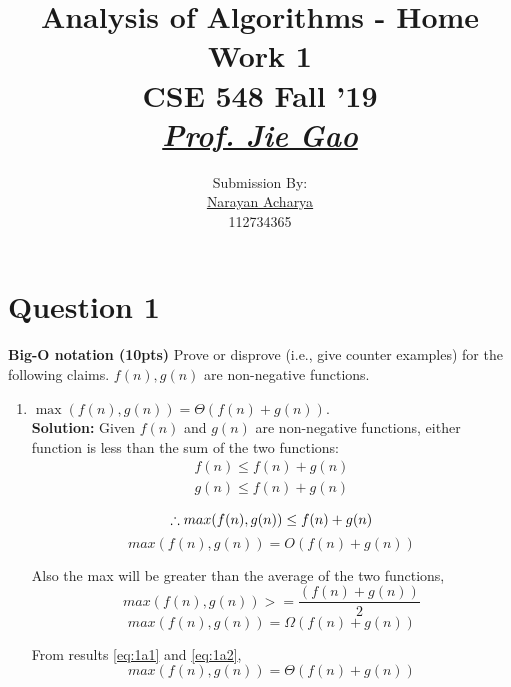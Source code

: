\documentclass[11pt]{article}
\title{
	Analysis of Algorithms - Home Work 1\\[2mm]
	\large CSE 548 Fall '19\\[1mm]
	\href{mailto:jgao@cs.stonybrook.edu}{\textit{Prof. Jie Gao}}
}
\author{
	\small Submission By: \\
	\href{mailto:nacharya@cs.stonybrook.edu}{Narayan Acharya} \\
	\small 112734365
}
\date{\vspace{-5ex}}
\begin{document}
\maketitle
\thispagestyle{fancy} %

\tableofcontents

\clearpage

\section{Question 1}

\textbf{Big-O notation (10pts)} Prove or disprove (i.e., give counter examples) for the following claims. $f(n), g(n)$ are non-negative functions.
    \begin{enumerate}
    \item $\max(f(n), g(n))=\Theta(f(n)+g(n))$. \\
    \textbf{Solution:}
    Given $f(n)$ and $g(n)$ are non-negative functions, either function is less than the sum of the two functions:
    \begin{equation*}
    \begin{split}
	    f(n) \le f(n) + g(n) \\
	    g(n) \le f(n) + g(n) \\
	\end{split}
    \end{equation*}
    \begin{equation*} 
    \therefore max(f(n), g(n)) \le f(n) + g(n) \\
    \end{equation*}
    \begin{equation} \label{eq:1a1}
        \boxed{max(f(n), g(n)) = O(f(n)+g(n))}
    \end{equation}
    
    Also the max will be greater than the average of the two functions,
    \begin{equation*}
		max(f(n), g(n)) >= \frac{(f(n)+g(n))}{2}
    \end{equation*}
    \begin{equation} \label{eq:1a2}
	    \boxed{max(f(n), g(n)) = \Omega(f(n)+g(n))}
    \end{equation}
    
    From results \ref{eq:1a1} and \ref{eq:1a2},
    \begin{equation*}
	    \boxed{max(f(n), g(n)) = \Theta(f(n)+g(n))}
    \end{equation*}
    

\end{enumerate}
\end{document}
